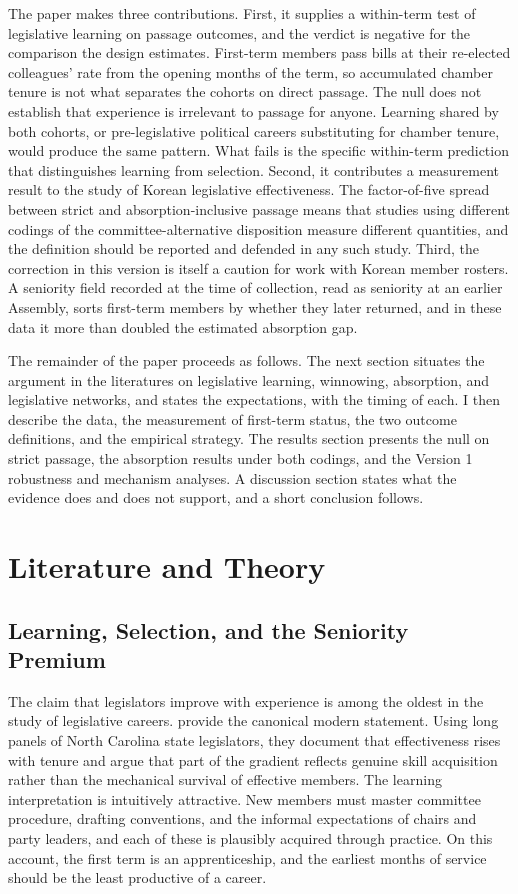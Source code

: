 \documentclass[11pt]{article}
\begin{document}
The paper makes three contributions. First, it supplies a within-term test of legislative learning on passage outcomes, and the verdict is negative for the comparison the design estimates. First-term members pass bills at their re-elected colleagues' rate from the opening months of the term, so accumulated chamber tenure is not what separates the cohorts on direct passage. The null does not establish that experience is irrelevant to passage for anyone. Learning shared by both cohorts, or pre-legislative political careers substituting for chamber tenure, would produce the same pattern. What fails is the specific within-term prediction that distinguishes learning from selection. Second, it contributes a measurement result to the study of Korean legislative effectiveness. The factor-of-five spread between strict and absorption-inclusive passage means that studies using different codings of the committee-alternative disposition measure different quantities, and the definition should be reported and defended in any such study. Third, the correction in this version is itself a caution for work with Korean member rosters. A seniority field recorded at the time of collection, read as seniority at an earlier Assembly, sorts first-term members by whether they later returned, and in these data it more than doubled the estimated absorption gap.

The remainder of the paper proceeds as follows. The next section situates the argument in the literatures on legislative learning, winnowing, absorption, and legislative networks, and states the expectations, with the timing of each. I then describe the data, the measurement of first-term status, the two outcome definitions, and the empirical strategy. The results section presents the null on strict passage, the absorption results under both codings, and the Version 1 robustness and mechanism analyses. A discussion section states what the evidence does and does not support, and a short conclusion follows.

\section{Literature and Theory}

\subsection{Learning, Selection, and the Seniority Premium}

The claim that legislators improve with experience is among the oldest in the study of legislative careers. \citet{padroimiquel2006} provide the canonical modern statement. Using long panels of North Carolina state legislators, they document that effectiveness rises with tenure and argue that part of the gradient reflects genuine skill acquisition rather than the mechanical survival of effective members. The learning interpretation is intuitively attractive. New members must master committee procedure, drafting conventions, and the informal expectations of chairs and party leaders, and each of these is plausibly acquired through practice. On this account, the first term is an apprenticeship, and the earliest months of service should be the least productive of a career.
\end{document}
